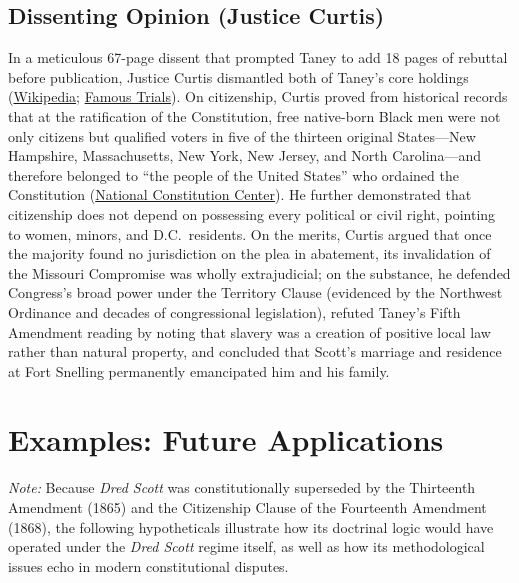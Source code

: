 \documentclass[12pt]{article}
\begin{document}
\subsection{Dissenting Opinion (Justice Curtis)}

In a meticulous 67-page dissent that prompted Taney to add 18 pages of rebuttal before publication, Justice Curtis dismantled both of Taney's core holdings (\href{https://en.wikipedia.org/wiki/Dred_Scott_v._Sandford}{Wikipedia}; \href{https://famous-trials.com/dredscott/2545-scott-v-sandford-the-dissent}{Famous Trials}). On citizenship, Curtis proved from historical records that at the ratification of the Constitution, free native-born Black men were not only citizens but qualified voters in five of the thirteen original States---New Hampshire, Massachusetts, New York, New Jersey, and North Carolina---and therefore belonged to ``the people of the United States'' who ordained the Constitution (\href{https://constitutioncenter.org/the-constitution/supreme-court-case-library/dred-scott-v-sandford}{National Constitution Center}). He further demonstrated that citizenship does not depend on possessing every political or civil right, pointing to women, minors, and D.C.\ residents. On the merits, Curtis argued that once the majority found no jurisdiction on the plea in abatement, its invalidation of the Missouri Compromise was wholly extrajudicial; on the substance, he defended Congress's broad power under the Territory Clause (evidenced by the Northwest Ordinance and decades of congressional legislation), refuted Taney's Fifth Amendment reading by noting that slavery was a creation of positive local law rather than natural property, and concluded that Scott's marriage and residence at Fort Snelling permanently emancipated him and his family.

\section{Examples: Future Applications}

\textit{Note:} Because \textit{Dred Scott} was constitutionally superseded by the Thirteenth Amendment (1865) and the Citizenship Clause of the Fourteenth Amendment (1868), the following hypotheticals illustrate how its doctrinal logic would have operated under the \textit{Dred Scott} regime itself, as well as how its methodological issues echo in modern constitutional disputes.
\end{document}
